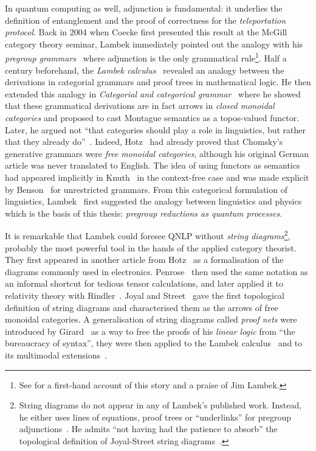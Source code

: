 In quantum computing as well, adjunction is fundamental: it underlies the definition of entanglement and the proof of correctness for the \emph{teleportation protocol}.
Back in 2004 when Coecke first presented this result at the McGill category theory seminar, Lambek immediately pointed out the analogy with his \emph{pregroup grammars}~\cite{Lambek99,Lambek01} where adjunction is the only grammatical rule\footnote
{See \cite{Coecke21} for a first-hand account of this story and a praise of Jim Lambek.}.
Half a century beforehand, the \emph{Lambek calculus}~\cite{Lambek58,Lambek59,Lambek61} revealed an analogy between the derivations in categorial grammars and proof trees in mathematical logic.
He then extended this analogy in \emph{Categorial and categorical grammar}~\cite{Lambek88} where he showed that these grammatical derivations are in fact arrows in \emph{closed monoidal categories} and proposed to cast Montague semantics as a topos-valued functor.
Later, he argued not ``that categories should play a role in linguistics, but rather that they already do''~\cite{Lambek99b}.
Indeed, Hotz~\cite{Hotz66} had already proved that Chomsky's generative grammars were \emph{free monoidal categories}, although his original German article was never translated to English.
The idea of using functors as semantics had appeared implicitly in Knuth~\cite{Knuth68a} in the context-free case and was made explicit by Benson~\cite{Benson70a} for unrestricted grammars.
From this categorical formulation of linguistics, Lambek~\cite{Lambek10} first suggested the analogy between linguistics and physics which is the basis of this thesis: \emph{pregroup reductions as quantum processes}.

It is remarkable that Lambek could foresee QNLP without \emph{string diagrams}\footnote
{String diagrams do not appear in any of Lambek's published work.
Instead, he either uses lines of equations, proof trees or ``underlinks'' for pregroup adjunctions~\cite{Lambek08}.
He admits ``not having had the patience to absorb'' the topological definition of Joyal-Street string diagrams~\cite{Lambek10}.
}, probably the most powerful tool in the hands of the applied category theorist.
They first appeared in another article from Hotz~\cite{Hotz65} as a formalisation of the diagrams commonly used in electronics.
Penrose~\cite{Penrose71} then used the same notation as an informal shortcut for tedious tensor calculations, and later applied it to relativity theory with Rindler~\cite{PenroseRindler84}.
Joyal and Street~\cite{JoyalStreet88,JoyalStreet91,JoyalStreet95} gave the first topological definition of string diagrams and characterised them as the arrows of free monoidal categories.
A generalisation of string diagrams called \emph{proof nets} were introduced by Girard~\cite{Girard87} as a way to free the proofs of his \emph{linear logic} from ``the bureaucracy of syntax'', they were then applied to the Lambek calculus~\cite{Roorda92} and to its multimodal extensions~\cite{MootPuite02}.

